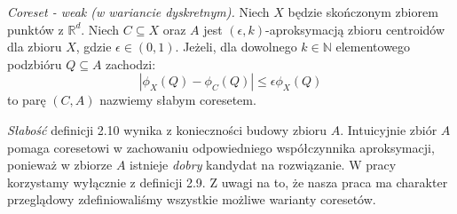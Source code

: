 \begin{definition}
    \emph{Coreset - weak (w wariancie dyskretnym).} Niech $X$ będzie skończonym zbiorem punktów z $\mathbb{R}^{d}$.
    Niech $C \subseteq X$ oraz $A$ jest $(\epsilon, k)$-aproksymacją zbioru centroidów dla zbioru $X$, gdzie $\epsilon \in (0, 1)$.
    Jeżeli, dla dowolnego $k \in \mathbb{N}$ elementowego podzbióru $Q \subseteq A$ zachodzi:
    \begin{equation}
        |\phi_{X}(Q) - \phi_{C}(Q)| \leq \epsilon\phi_{X}(Q)
    \end{equation}
    to parę $(C, A)$ nazwiemy słabym coresetem.
\end{definition}

\noindent
\textit{Słabość} definicji 2.10 wynika z konieczności budowy zbioru $A$.
Intuicyjnie zbiór $A$ pomaga coresetowi w zachowaniu odpowiedniego współczynnika aproksymacji, ponieważ w zbiorze $A$ istnieje \textit{dobry} kandydat na rozwiązanie.
W pracy korzystamy wyłącznie z definicji 2.9.
Z uwagi na to, że nasza praca ma charakter przeglądowy zdefiniowaliśmy wszystkie możliwe warianty coresetów.